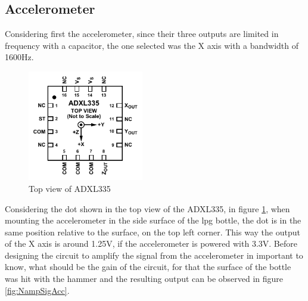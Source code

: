 \subsection{Accelerometer}
Considering first the accelerometer, since their three outputs are limited in frequency with a capacitor, the one selected was the X axis with a bandwidth of 1600Hz.
\begin{figure}[]
    \centering
    \includegraphics[width=0.45\textwidth]{Chapters/4CHP/Figures/accTopView.pdf}
    \caption{Top view of ADXL335}
    \label{fig:topViewADXL}
\end{figure}
Considering the dot shown in the top view of the ADXL335, in figure \ref{fig:topViewADXL}, when mounting the accelerometer in the side surface of the \acrshort{lpg} bottle, the dot is in the same position relative to the surface, on the top left corner. This way the output of the X axis is around 1.25V, if the accelerometer is powered with 3.3V. Before designing the circuit to amplify the signal from the accelerometer in important to know, what should be the gain of the circuit, for that the surface of the bottle was hit with the hammer and the resulting output can be observed in figure \ref{fig:NampSigAcc}.
